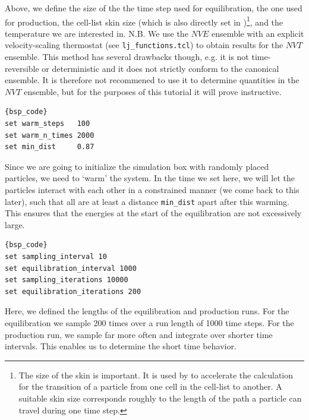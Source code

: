 \documentclass[
paper=a4,                       %
fontsize=11pt,                  %
twoside,                        %
footsepline,                    %
headsepline,                    %
headinclude=false,              %
footinclude=false,              %
pagesize,                       %
]{scrartcl}
\begin{document}
\noindent Above, we define the size of the the time step used for equilibration, the one used for production, the cell-list skin size (which is also directly set in \es{})\footnote{The size of the skin is important. It is used by \es{} to accelerate the calculation for the transition of a particle from one cell in the cell-list to another. A suitable skin size corresponds roughly to the length of the path a particle can travel during one time step.}, and the temperature we are interested in. N.B. We use the $NVE$ ensemble with an explicit velocity-scaling thermostat (see \texttt{lj\_functions.tcl}) to obtain results for the $NVT$ ensemble. This method has several drawbacks though, e.g. it is not time-reversible or deterministic and it does not strictly conform to the canonical ensemble. It is therefore not recommened to use it to determine quantities in the $NVT$ ensemble, but for the purposes of this tutorial it will prove instructive.

{\small\vspace{0,2cm}
\begin{lstlisting}[firstnumber= auto]{bsp_code}
set warm_steps   100
set warm_n_times 2000
set min_dist     0.87
\end{lstlisting}\vspace{0,2cm}
}

\noindent Since we are going to initialize the simulation box with randomly placed particles, we need to `warm' the system. In the time we set here, we will let the particles interact with each other in a constrained manner (we come back to this later), such that all are at least a distance \texttt{min\_dist} apart after this warming. This ensures that the energies at the start of the equilibration are not excessively large.

{\small\vspace{0,2cm}
\begin{lstlisting}[firstnumber= auto]{bsp_code}
set sampling_interval 10
set equilibration_interval 1000
set sampling_iterations 10000
set equilibration_iterations 200
\end{lstlisting}\vspace{0,2cm}
}

\noindent Here, we defined the lengths of the equilibration and production runs. For the equilibration we sample 200 times over a run length of 1000 time steps. For the production run, we sample far more often and integrate over shorter time intervals. This enables us to determine the short time behavior.
\end{document}
